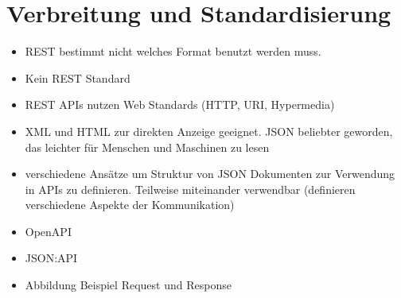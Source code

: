 \section{Verbreitung und Standardisierung}
\begin{itemize}
  \item REST bestimmt nicht welches Format benutzt werden muss.
  \item Kein REST Standard
  \item REST APIs nutzen Web Standards (HTTP, URI, Hypermedia)
  \item XML und HTML zur direkten Anzeige geeignet. JSON beliebter geworden, das leichter für Menschen und Maschinen zu lesen
  \item verschiedene Ansätze um Struktur von JSON Dokumenten zur Verwendung in APIs zu definieren. Teilweise miteinander verwendbar (definieren verschiedene Aspekte der Kommunikation)
  \item OpenAPI
  \item JSON:API
  \item Abbildung Beispiel Request und Response
\end{itemize}
